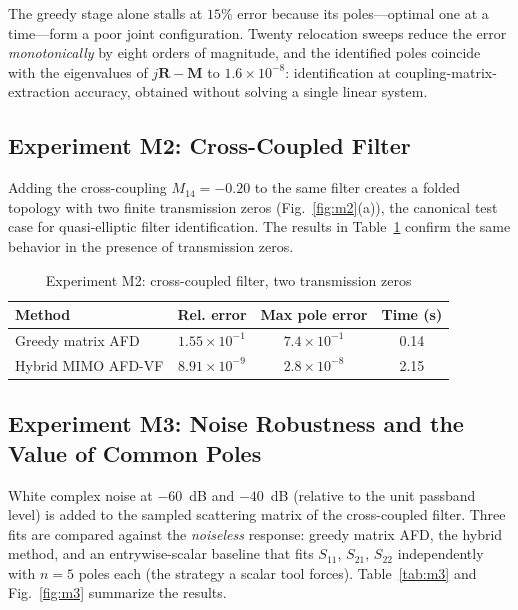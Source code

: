 \documentclass[journal]{IEEEtran}%
\begin{document}
The greedy stage alone stalls at $15\%$ error because its poles---optimal one at a time---form a poor joint configuration. Twenty relocation sweeps reduce the error \emph{monotonically} by eight orders of magnitude, and the identified poles coincide with the eigenvalues of $j\mathbf{R} - \mathbf{M}$ to $1.6\times10^{-8}$: identification at coupling-matrix-extraction accuracy, obtained without solving a single linear system.

\subsection{Experiment M2: Cross-Coupled Filter}

Adding the cross-coupling $M_{14} = -0.20$ to the same filter creates a folded topology with two finite transmission zeros (Fig.~\ref{fig:m2}(a)), the canonical test case for quasi-elliptic filter identification. The results in Table~\ref{tab:m2} confirm the same behavior in the presence of transmission zeros.

\begin{table}[h]
\centering
\caption{Experiment M2: cross-coupled filter, two transmission zeros}
\label{tab:m2}
\begin{tabular}{lccc}
\toprule
Method & Rel. error & Max pole error & Time (s) \\
\midrule
Greedy matrix AFD & $1.55 \times 10^{-1}$ & $7.4 \times 10^{-1}$ & 0.14 \\
Hybrid MIMO AFD-VF & $8.91 \times 10^{-9}$ & $2.8 \times 10^{-8}$ & 2.15 \\
\bottomrule
\end{tabular}
\end{table}

\subsection{Experiment M3: Noise Robustness and the Value of Common Poles}

White complex noise at $-60$~dB and $-40$~dB (relative to the unit passband level) is added to the sampled scattering matrix of the cross-coupled filter. Three fits are compared against the \emph{noiseless} response: greedy matrix AFD, the hybrid method, and an entrywise-scalar baseline that fits $S_{11}$, $S_{21}$, $S_{22}$ independently with $n=5$ poles each (the strategy a scalar tool forces). Table~\ref{tab:m3} and Fig.~\ref{fig:m3} summarize the results.
\end{document}
